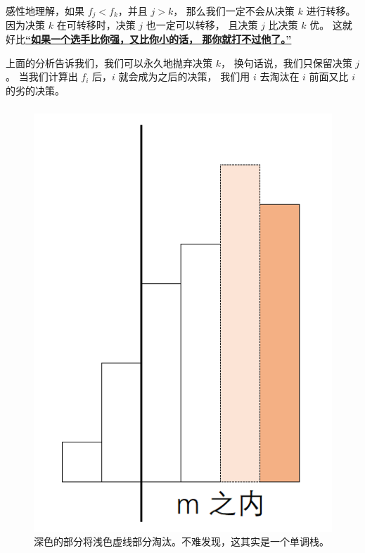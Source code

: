 \documentclass[9pt, UTF8]{beamer} %
\newcommand \fts {\frametitle{\insertsubsection}}
\newcommand \bpause { \bigskip \pause }
\begin{document}
	\begin{frame}
		\fts

		感性地理解，如果 $f_j < f_k$，并且 $j > k$，
		那么我们一定不会从决策 $k$ 进行转移。
		因为决策 $k$ 在可转移时，决策 $j$ 也一定可以转移，
		且决策 $j$ 比决策 $k$ 优。
		这就好比\textbf{\uline{``如果一个选手比你强，又比你小的话，
		那你就打不过他了。''}}

		\bpause

		上面的分析告诉我们，我们可以永久地抛弃决策 $k$，
		换句话说，我们只保留决策 $j$。
		当我们计算出 $f_i$ 后，$i$ 就会成为之后的决策，
		我们用 $i$ 去淘汰在 $i$ 前面又比 $i$ 的劣的决策。
	\end{frame}

	\begin{frame}
		\fts

		\begin{figure}
			\centering
			\includegraphics[scale=0.2]{pic/pic1.png}
			\caption{深色的部分将浅色虚线部分淘汰。不难发现，这其实是一个单调栈。}
		\end{figure}
	\end{frame}
\end{document}
